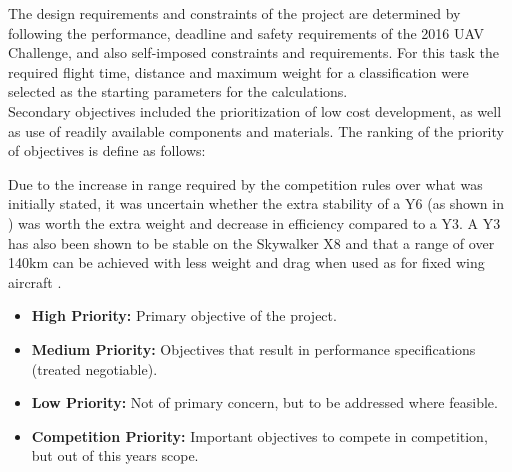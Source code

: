 The design requirements and constraints of the project are determined by following the performance, deadline and safety requirements of the 2016 UAV Challenge, and also self-imposed constraints and requirements. For this task the required flight time, distance and maximum weight for a classification were selected as the starting parameters for the calculations.\\

Secondary objectives included the prioritization of low cost development, as well as use of readily available components and materials. The ranking of the priority of objectives is define as follows:

\color{red}
Due to the increase in range required by the competition rules over what was initially stated, it was uncertain whether the extra stability of a Y6 (as shown in \cite{ref:firefly6}) was worth the extra weight and decrease in efficiency compared to a Y3. A Y3 has also been shown to be stable on the Skywalker X8 \cite{ref:y3} and that a range of over 140km can be achieved with less weight and drag when used as for fixed wing aircraft \cite{ref:range}.
\color{black}

\begin{itemize}
	\item \textbf{High Priority:} Primary objective of the project.
	\item \textbf{Medium Priority:} Objectives that result in performance specifications (treated negotiable).
	\item \textbf{Low Priority:} Not of primary concern, but to be addressed where feasible.
	\item \textbf{Competition Priority:} Important objectives to compete in competition, but out of this years scope.
\end{itemize}

